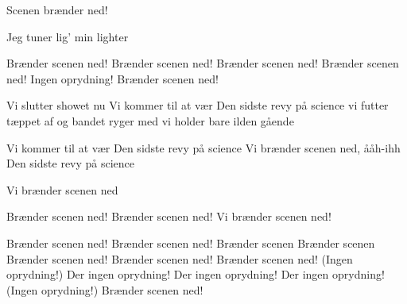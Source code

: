 \documentclass[a4paper,11pt]{article}
\begin{document}
\begin{song}
Scenen brænder ned!

Jeg tuner lig’ min lighter

Brænder scenen ned!
Brænder scenen ned!
Brænder scenen ned!
Brænder scenen ned!
Ingen oprydning!
Brænder scenen ned!


Vi slutter showet nu
Vi kommer til at vær
Den sidste revy på science 
vi futter tæppet af 
og bandet ryger med 
vi holder bare ilden gående 

Vi kommer til at vær
Den sidste revy på science 
Vi brænder scenen ned, ååh-ihh
Den sidste revy på science 


Vi brænder scenen ned

Brænder scenen ned!
Brænder scenen ned!
Vi brænder scenen ned!

Brænder scenen ned!
Brænder scenen ned!
Brænder scenen
Brænder scenen
Brænder scenen ned!
Brænder scenen ned!
Brænder scenen ned!
(Ingen oprydning!)
Der ingen oprydning!
Der ingen oprydning!
Der ingen oprydning!
(Ingen oprydning!)
Brænder scenen ned!


\end{song}
\end{document}
